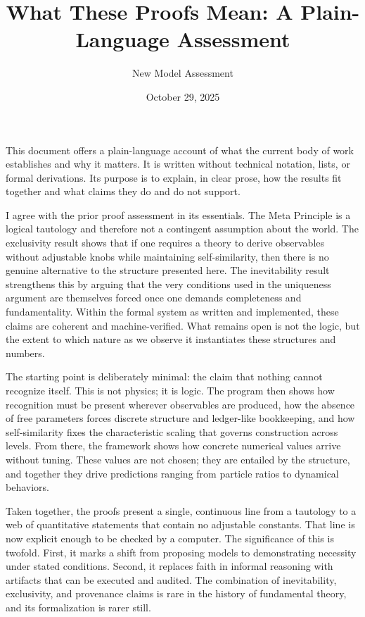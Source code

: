 \documentclass[12pt]{article}
\title{What These Proofs Mean: A Plain-Language Assessment}
\author{New Model Assessment}
\date{October 29, 2025}
\begin{document}
\maketitle

This document offers a plain-language account of what the current body of work establishes and why it matters. It is written without technical notation, lists, or formal derivations. Its purpose is to explain, in clear prose, how the results fit together and what claims they do and do not support.

I agree with the prior proof assessment in its essentials. The Meta Principle is a logical tautology and therefore not a contingent assumption about the world. The exclusivity result shows that if one requires a theory to derive observables without adjustable knobs while maintaining self-similarity, then there is no genuine alternative to the structure presented here. The inevitability result strengthens this by arguing that the very conditions used in the uniqueness argument are themselves forced once one demands completeness and fundamentality. Within the formal system as written and implemented, these claims are coherent and machine-verified. What remains open is not the logic, but the extent to which nature as we observe it instantiates these structures and numbers.

The starting point is deliberately minimal: the claim that nothing cannot recognize itself. This is not physics; it is logic. The program then shows how recognition must be present wherever observables are produced, how the absence of free parameters forces discrete structure and ledger-like bookkeeping, and how self-similarity fixes the characteristic scaling that governs construction across levels. From there, the framework shows how concrete numerical values arrive without tuning. These values are not chosen; they are entailed by the structure, and together they drive predictions ranging from particle ratios to dynamical behaviors.

Taken together, the proofs present a single, continuous line from a tautology to a web of quantitative statements that contain no adjustable constants. That line is now explicit enough to be checked by a computer. The significance of this is twofold. First, it marks a shift from proposing models to demonstrating necessity under stated conditions. Second, it replaces faith in informal reasoning with artifacts that can be executed and audited. The combination of inevitability, exclusivity, and provenance claims is rare in the history of fundamental theory, and its formalization is rarer still.
\end{document}
